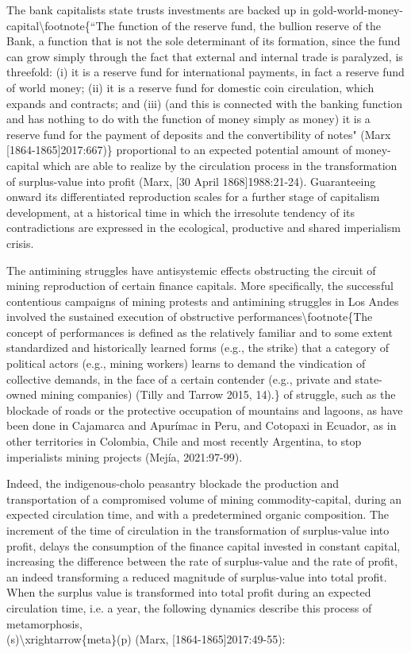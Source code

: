 \documentclass[
]{article}
\begin{document}
The bank capitalists state trusts investments are backed up in
gold-world-money-capital\textbackslash footnote\{``The function of the
reserve fund, the bullion reserve of the Bank, a function that is not
the sole determinant of its formation, since the fund can grow simply
through the fact that external and internal trade is paralyzed, is
threefold: (i) it is a reserve fund for international payments, in fact
a reserve fund of world money; (ii) it is a reserve fund for domestic
coin circulation, which expands and contracts; and (iii) (and this is
connected with the banking function and has nothing to do with the
function of money simply as money) it is a reserve fund for the payment
of deposits and the convertibility of notes" (Marx
{[}1864-1865{]}2017:667)\} proportional to an expected potential amount
of money-capital which are able to realize by the circulation process in
the transformation of surplus-value into profit (Marx, {[}30 April
1868{]}1988:21-24). Guaranteeing onward its differentiated reproduction
scales for a further stage of capitalism development, at a historical
time in which the irresolute tendency of its contradictions are
expressed in the ecological, productive and shared imperialism crisis.

The antimining struggles have antisystemic effects obstructing the
circuit of mining reproduction of certain finance capitals. More
specifically, the successful contentious campaigns of mining protests
and antimining struggles in Los Andes involved the sustained execution
of obstructive performances\textbackslash footnote\{The concept of
performances is defined as the relatively familiar and to some extent
standardized and historically learned forms (e.g., the strike) that a
category of political actors (e.g., mining workers) learns to demand the
vindication of collective demands, in the face of a certain contender
(e.g., private and state-owned mining companies) (Tilly and Tarrow 2015,
14).\} of struggle, such as the blockade of roads or the protective
occupation of mountains and lagoons, as have been done in Cajamarca and
Apurímac in Peru, and Cotopaxi in Ecuador, as in other territories in
Colombia, Chile and most recently Argentina, to stop imperialists mining
projects (Mejía, 2021:97-99).

Indeed, the indigenous-cholo peasantry blockade the production and
transportation of a compromised volume of mining commodity-capital,
during an expected circulation time, and with a predetermined organic
composition. The increment of the time of circulation in the
transformation of surplus-value into profit, delays the consumption of
the finance capital invested in constant capital, increasing the
difference between the rate of surplus-value and the rate of profit, an
indeed transforming a reduced magnitude of surplus-value into total
profit.\\
When the surplus value is transformed into total profit during an
expected circulation time, i.e. a year, the following dynamics describe
this process of metamorphosis,\\
(s\textquotesingle)\textbackslash xrightarrow\{meta\}(p\textquotesingle)
(Marx, {[}1864-1865{]}2017:49-55):
\end{document}

